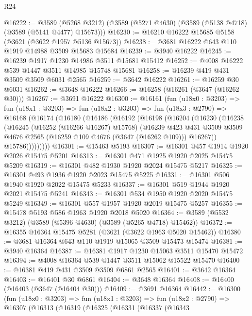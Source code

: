 \begin{lexlean}{R24}
\begin{coremodule}
@16222 := @3589
    (@5268 @3212)
    (@3589 (@5271 @4630) (@3589 (@5138 @4718) (@3589 (@5141 @4477) @15673)))
@16230 := @16210 @16222 @15685 @5158 (@3621 (@3622 @1957 @5136 @15673))
@16238 := @3681 @16222 @643 @110 @1919 @14988 @3509 @15683 @15684
@16239 := @3940 @16222
@16245 := @16239 @1917 @1230 @14986 @3511 @15681 @15412
@16252 := @4008 @16222 @539 @1447 @3511 @14985 @15748 @15681
@16258 := @16239 @419 @431 @3509 @3509 @6031 @2565
@16259 := @3642 @16222
@16261 := @16259 @30 @6031
@16262 := @3648 @16222
@16266 := @16258 (@16261 (@3647 (@16262 @30)))
@16267 := @3691 @16222
@16300 := @16161
    (fun (u18x0 : @3203) =>
    fun (u18x1 : @3203) =>
    fun (u18x2 : @3203) =>
    fun (u18x3 : @2790) =>
    @16168
      (@16174
        (@16180
          (@16186
            (@16192
              (@16198
                (@16204
                  (@16230
                    (@16238
                      (@16245
                        (@16252 (@16266 @16267) @15768)
                        (@16239
                          @423
                          @431
                          @3509
                          @3509
                          @4676
                          @2565
                          (@16259 @109 @4676 (@3647 (@16262 @109)))
                          @16267))
                      @15786)))))))))
@16301 := @15463 @5193
@16307 := @16301 @457 @1914 @1920 @2026 @15475 @5201
@16313 := @16301 @471 @1925 @1920 @2025 @15475 @5209
@16319 := @16301 @482 @1930 @1920 @2024 @15475 @5217
@16325 := @16301 @493 @1936 @1920 @2023 @15475 @5225
@16331 := @16301 @506 @1940 @1920 @2022 @15475 @5233
@16337 := @16301 @519 @1944 @1920 @2021 @15475 @5241
@16343 := @16301 @534 @1950 @1920 @2020 @15475 @5249
@16349 := @16301 @557 @1957 @1920 @2019 @15475 @5257
@16355 := @15478 @5193 @586 @1963 @1920 @2018 @5020
@16364 := @3589 (@5532 @3212) (@3589 (@5396 @4630) (@3589 (@5265 @4718) @15462))
@16372 := @16355 @16364 @15475 @5281 (@3621 (@3622 @1963 @5020 @15462))
@16380 := @3681 @16364 @643 @110 @1919 @15065 @3509 @15473 @15474
@16381 := @3940 @16364
@16387 := @16381 @1917 @1230 @15063 @3511 @15470 @15472
@16394 := @4008 @16364 @539 @1447 @3511 @15062 @15522 @15470
@16400 := @16381 @419 @431 @3509 @3509 @6861 @2565
@16401 := @3642 @16364
@16403 := @16401 @30 @6861
@16404 := @3648 @16364
@16408 := @16400 (@16403 (@3647 (@16404 @30)))
@16409 := @3691 @16364
@16442 := @16300
    (fun (u18x0 : @3203) =>
    fun (u18x1 : @3203) =>
    fun (u18x2 : @2790) =>
    @16307
      (@16313
        (@16319
          (@16325
            (@16331
              (@16337
                (@16343

\end{coremodule}
\end{lexlean}
